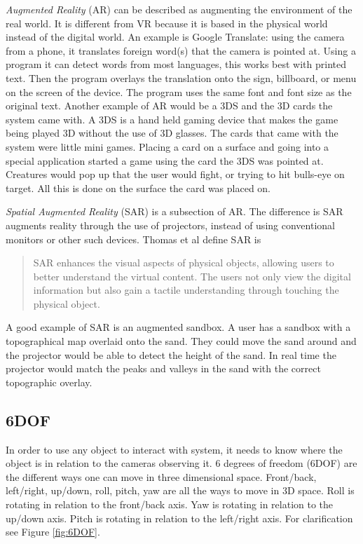 \documentclass{sig-alternate}
\begin{document}
\textit{Augmented Reality} (AR) can be described as augmenting the environment of the real world. It is different from VR because it is based in the physical world instead of the digital world. An example is Google Translate: using the camera from a phone, it translates foreign word(s) that the camera is pointed at. Using a program it can detect words from most languages, this works best with printed text. Then the program overlays the translation onto the sign, billboard, or menu on the screen of the device. The program uses the same font and font size as the original text. Another example of AR would be a 3DS and the 3D cards the system came with. A 3DS is a hand held gaming device that makes the game being played 3D without the use of 3D glasses. The cards that came with the system were little mini games. Placing a card on a surface and going into a special application started a game using the card the 3DS was pointed at. Creatures would pop up that the user would fight, or trying to hit bulls-eye on target. All this is done on the surface the card was placed on.   

\textit{Spatial Augmented Reality} (SAR) is a subsection of AR. The difference is SAR augments reality through the use of projectors, instead of using conventional monitors or other such devices. Thomas et al \cite{3D} define SAR is 
\begin{quote}
SAR enhances the visual aspects of physical objects, allowing users to better understand the virtual content. The users not only view the digital information but also gain a tactile understanding through touching the physical object.
\end{quote} 
A good example of SAR is an augmented sandbox. A user has a sandbox with a topographical map overlaid onto the sand. They could move the sand around and the projector would be able to detect the height of the sand. In real time the projector would match the peaks and valleys in the sand with the correct topographic overlay. 

\subsection{6DOF}
\label{sec:6DOF}
In order to use any object to interact with system, it needs to know where the object is in relation to the cameras observing it. 6 degrees of freedom (6DOF) are the different ways one can move in three dimensional space. Front/back, left/right, up/down, roll, pitch, yaw are all the ways to move in 3D space. Roll is rotating in relation to the front/back axis. Yaw is rotating in relation to the up/down axis. Pitch is rotating in relation to the left/right axis. For clarification see Figure \ref{fig:6DOF}.
\end{document}
